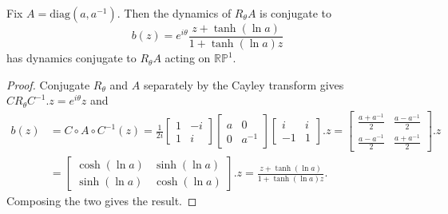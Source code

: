 \documentclass[10pt,a4paper]{amsart}
\newcommand{\RP}{\mathbb{RP}}
\begin{document}
\begin{lemma} \label{equivalence}
    Fix $A = \mathrm{diag}(a,a^{-1})$.
   Then the dynamics of $R_\theta A$ is conjugate to $$b(z) = e^{i \theta} \frac{z + \tanh(\ln a)}{1 + \tanh(\ln a) z}$$ has dynamics conjugate to $R_\theta A$ acting on $\RP^1$.
\end{lemma}

\begin{proof}

Conjugate $R_\theta$ and $A$ separately by the Cayley transform gives $C R_\theta C^{-1}.z = e^{i \theta} z$ and \begin{align*}
    b(z) &= C \circ A \circ C^{-1}(z) 
    = \frac{1}{2i} \begin{bmatrix}
        1 & -i\\ 1 & i
    \end{bmatrix} \begin{bmatrix}
        a & 0 \\ 0 & a^{-1}
    \end{bmatrix} \begin{bmatrix}
        i & i\\ -1 & 1
    \end{bmatrix}.z  = \begin{bmatrix}
        \frac{a + a^{-1}}{2} & \frac{a - a^{-1}}{2} \\
        \frac{a - a^{-1}}{2} & \frac{a + a^{-1}}{2}
    \end{bmatrix}.z \\ &= \begin{bmatrix}
        \cosh(\ln a) & \sinh (\ln a) \\
        \sinh (\ln a) & \cosh ( \ln a)
    \end{bmatrix}.z
   =  \frac{z+\tanh (\ln a)}{1 + \tanh (\ln a) z}.
\end{align*} Composing the two gives the result. 

\end{proof}
\end{document}
